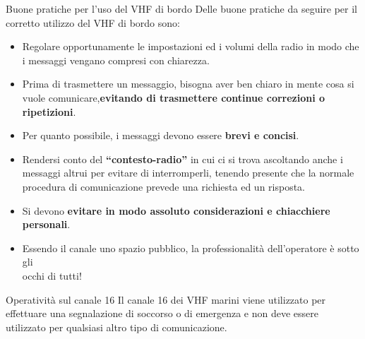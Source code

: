 \documentclass[aspectratio=169]{beamer}
\begin{document}
\begin{frame}{Buone pratiche per l'uso del VHF di bordo}
	Delle buone pratiche da seguire per il corretto utilizzo del VHF di bordo sono:\\
	\begin{itemize}
		\item Regolare opportunamente le impostazioni ed i volumi della radio in modo che i messaggi vengano compresi con chiarezza.
		\item Prima di trasmettere un messaggio, bisogna aver ben chiaro in mente cosa si vuole comunicare,\textbf{evitando di trasmettere continue correzioni o ripetizioni}.
		\item Per quanto possibile, i messaggi devono essere \textbf{brevi e concisi}.
		\item Rendersi conto del \textbf{“contesto-radio”} in cui ci si trova ascoltando anche i messaggi altrui per evitare di interromperli, tenendo presente che la normale procedura di comunicazione prevede una richiesta ed un risposta.
		\item Si devono \textbf{evitare in modo assoluto considerazioni e chiacchiere personali}.
		\item {\textcolor{red!80}{Essendo il canale uno spazio pubblico, la professionalità dell'operatore è sotto gli \\occhi di tutti!}}
	\end{itemize}
\end{frame}

\begin{frame}{Operatività sul canale 16}
	Il canale 16 dei VHF marini viene utilizzato per effettuare una segnalazione di soccorso o di emergenza e non deve essere utilizzato per qualsiasi altro tipo di comunicazione.
\end{frame}
\end{document}
